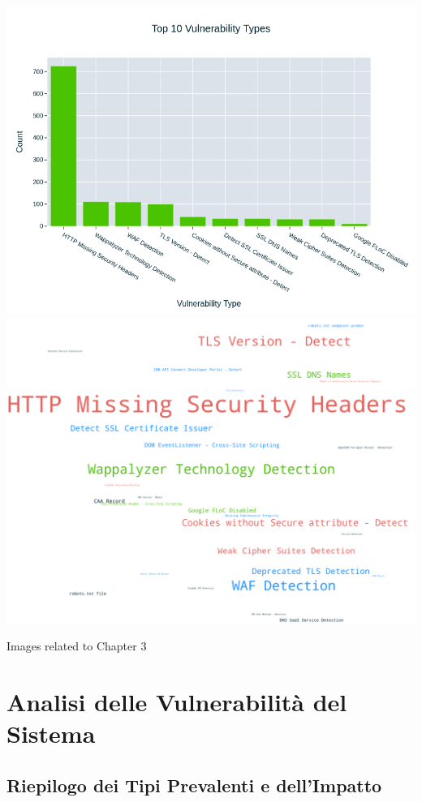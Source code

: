 \begin{center}
\includegraphics[width=\linewidth]{pngs/2_1.png}
\vspace{1cm}\includegraphics[width=\linewidth]{pngs/2_2.png}
\vspace{1cm}\caption{Images related to Chapter 3}
\end{center}
\chapter{Analisi delle Vulnerabilità del Sistema}

\section{Riepilogo dei Tipi Prevalenti e dell'Impatto}

